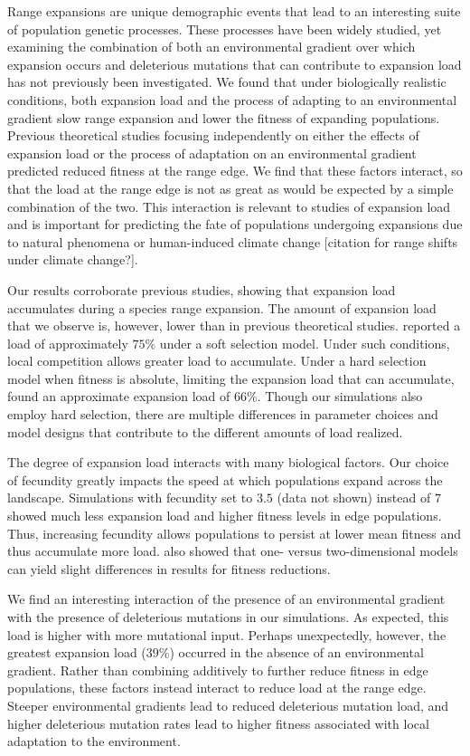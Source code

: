 Range expansions are unique demographic events that lead to an interesting suite of population genetic processes. These processes have been widely studied, yet examining the combination of both an environmental gradient over which expansion occurs and deleterious mutations that can contribute to expansion load has not previously been investigated. We found that under biologically realistic conditions, both expansion load and the process of adapting to an environmental gradient slow range expansion and lower the fitness of expanding populations. Previous theoretical studies focusing independently on either the effects of expansion load or the process of adaptation on an environmental gradient predicted reduced fitness at the range edge. We find that these factors interact, so that the load at the range edge is not as great as would be expected by a simple combination of the two. This interaction is relevant to studies of expansion load and is important for  predicting the fate of populations undergoing expansions due to natural phenomena or human-induced climate change [\color{red}citation for range shifts under climate change?\color{black}]. 

Our results corroborate previous studies, showing that expansion load accumulates during a species range expansion. The amount of expansion load that we observe is, however, lower than in previous theoretical studies. \citet{Peischl:2013} reported a load of approximately $75\%$ under a soft selection model. Under such conditions, local competition allows greater load to accumulate. Under a hard selection model when fitness is absolute, limiting the expansion load that can accumulate, \citet{Peischl:2015} found an approximate expansion load of $66\%$. Though our simulations also employ hard selection, there are multiple differences in parameter choices and model designs that contribute to the different amounts of load realized. 

The degree of expansion load interacts with many biological factors. Our choice of fecundity greatly impacts the speed at which populations expand across the landscape. Simulations with fecundity set to $3.5$ (data not shown) instead of $7$ showed much less expansion load and higher fitness levels in edge populations. Thus, increasing fecundity allows populations to persist at lower mean fitness and thus accumulate more load. \citep{Peischl:2013} also showed that one- versus two-dimensional models can yield slight differences in results for fitness reductions. 

We find an interesting interaction of the presence of an environmental gradient with the presence of deleterious mutations in our simulations. As expected, this load is higher with more mutational input. Perhaps unexpectedly, however, the greatest expansion load ($39\%$) occurred in the absence of an environmental gradient. Rather than combining additively to further reduce fitness in edge populations, these factors instead interact to reduce load at the range edge. Steeper environmental gradients lead to reduced deleterious mutation load, and higher deleterious mutation rates lead to higher fitness associated with local adaptation to the environment.

